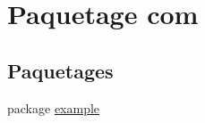 \hypertarget{namespacecom}{}\section{Paquetage com}
\label{namespacecom}
\subsection*{Paquetages}
\begin{DoxyCompactItemize}
\item 
package \hyperlink{namespacecom_1_1example}{example}
\end{DoxyCompactItemize}
